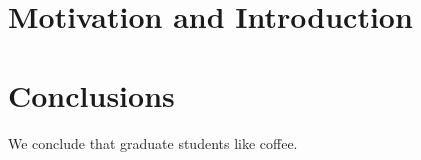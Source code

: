 \documentclass{uiucthesis2021}
\newcounter{counterforappendices}
\begin{document}

\mainmatter

\chapter{Motivation and Introduction}
% 


% 

\chapter{Conclusions}

We conclude that graduate students like coffee.


\backmatter

\printbibliography[heading=bibintoc,title={References}]





% 
\end{document}
